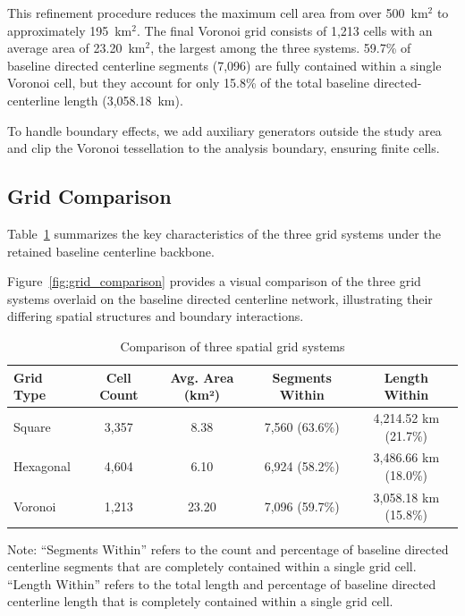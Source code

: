 \documentclass[12pt]{article}
\begin{document}
	This refinement procedure reduces the maximum cell area from over 500~km$^2$ to approximately 195~km$^2$. The final Voronoi grid consists of 1,213 cells with an average area of 23.20~km$^2$, the largest among the three systems. 59.7\% of baseline directed centerline segments (7,096) are fully contained within a single Voronoi cell, but they account for only 15.8\% of the total baseline directed-centerline length (3,058.18~km).
	
	To handle boundary effects, we add auxiliary generators outside the study area and clip the Voronoi tessellation to the analysis boundary, ensuring finite cells.

	\subsection{Grid Comparison}
	
		Table~\ref{tab:grid_comparison} summarizes the key characteristics of the three grid systems under the retained baseline centerline backbone.
	
		Figure~\ref{fig:grid_comparison} provides a visual comparison of the three grid systems overlaid on the baseline directed centerline network, illustrating their differing spatial structures and boundary interactions.
	
	\begin{table}[h!]
		\centering
		\caption{Comparison of three spatial grid systems}
		\label{tab:grid_comparison}
		\begin{tabular}{lcccc}
			\toprule
			Grid Type & Cell Count & Avg. Area (km²) & Segments Within & Length Within \\
			\midrule
			Square & 3,357 & 8.38 & 7,560 (63.6\%) & 4,214.52 km (21.7\%) \\
			Hexagonal & 4,604 & 6.10 & 6,924 (58.2\%) & 3,486.66 km (18.0\%) \\
			Voronoi & 1,213 & 23.20 & 7,096 (59.7\%) & 3,058.18 km (15.8\%) \\
			\bottomrule
		\end{tabular}
		\vspace{0.3em}
		\begin{minipage}{\textwidth}
			\footnotesize
			\raggedright
			Note: ``Segments Within'' refers to the count and percentage of baseline directed centerline segments that are completely contained within a single grid cell. ``Length Within'' refers to the total length and percentage of baseline directed centerline length that is completely contained within a single grid cell.
		\end{minipage}
	\end{table}
	
\end{document}
